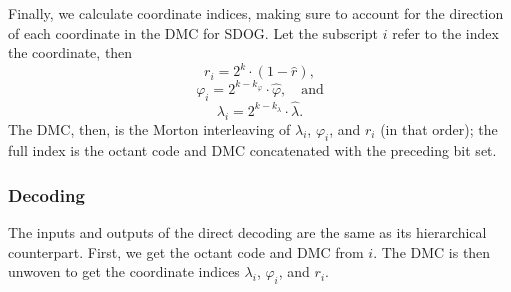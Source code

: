 Finally, we calculate coordinate indices, making sure to account for the direction of each coordinate in the DMC for SDOG.
Let the subscript $i$ refer to the index the coordinate, then
%
\begin{equation*}
r_i = 2^k \cdot ( 1 - \hat{r} ),
\end{equation*}
%
\begin{equation*}
\varphi_i = 2^{k - k_\varphi} \cdot \hat{\varphi}, \quad \text{and}
\end{equation*}
%
\begin{equation*}
\lambda_i = 2^{k - k_\lambda} \cdot \hat{\lambda}.
\end{equation*}
%
The DMC, then, is the Morton interleaving of $\lambda_i$, $\varphi_i$, and $r_i$ (in that order); the full index is the octant code and DMC concatenated with the preceding bit set.


\subsubsection{Decoding}
The inputs and outputs of the direct decoding are the same as its hierarchical counterpart.
First, we get the octant code and DMC from $i$.
The DMC is then unwoven to get the coordinate indices $\lambda_i$, $\varphi_i$, and $r_i$.


